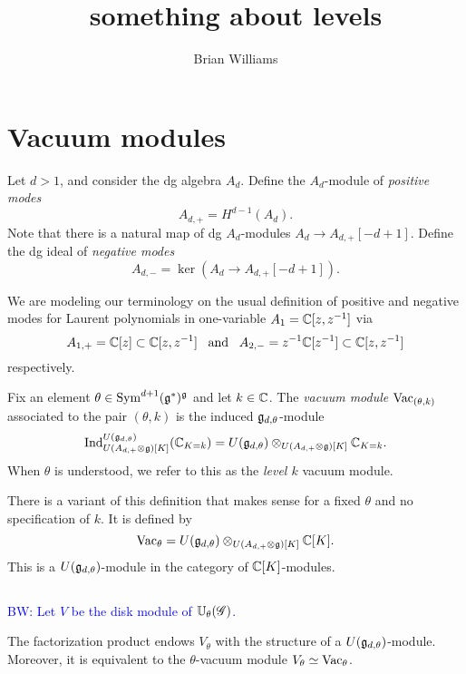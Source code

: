 \documentclass[11pt]{amsart}
\title{something about levels}
\author{Brian Williams}
\def\brian{\textcolor{blue}{BW: }\textcolor{blue}}
\newcommand{\changelocaltocdepth}[1]{%
  \addtocontents{toc}{\protect\setcounter{tocdepth}{#1}}%
  \setcounter{tocdepth}{#1}%
}
\begin{document}
\maketitle

%
%
%
%
%
%

\section{Vacuum modules}

\begin{dfn}
Let $d > 1$, and consider the dg algebra $A_d$. 
Define the $A_d$-module of {\em positive modes}
\[
A_{d,+} = H^{d-1}(A_d) .
\] 
Note that there is a natural map of dg $A_d$-modules $A_{d} \to A_{d,+}[-d+1]$. 
Define the dg ideal of {\em negative modes}
\[
A_{d,-} = \ker\left(A_d \to A_{d,+}[-d+1]\right) .
\]
\end{dfn}

\begin{rmk} 
We are modeling our terminology on the usual definition of positive and negative modes for Laurent polynomials in one-variable $A_1 = \mathbb C[z,z^{-1}]$ via
\[
A_{1,+} = \mathbb C[z] \subset \mathbb C[z,z^{-1}]  \;\;\; {\rm and} \;\;\;  A_{2,-} = z^{-1} \mathbb C[z^{-1}] \subset \mathbb C[z,z^{-1}]
\]
respectively. 
\end{rmk}

\def\Vac{{\rm Vac}}

\begin{dfn}
Fix an element $\theta \in {\rm Sym}^{d+1}(\mathfrak g^*)^\mathfrak g$ and let $k \in \mathbb C$.
The {\em vacuum module} $\Vac_{(\theta,k)}$ associated to the pair $(\theta, k)$ is the induced $\mathfrak g_{d, \theta}$-module
\[
{\rm Ind}_{U(A_{d,+} \otimes \mathfrak g)[K]}^{U(\mathfrak g_{d, \theta})} (\mathbb C_{K=k}) = U(\mathfrak g_{d,\theta}) \otimes_{U(A_{d,+} \otimes \mathfrak g)[K]} \mathbb C_{K=k} .
\] 
When $\theta$ is understood, we refer to this as the {\em level $k$} vacuum module. 
\end{dfn}

There is a variant of this definition that makes sense for a fixed $\theta$ and no specification of $k$. 
It is defined by
\[
{\rm Vac}_\theta = U(\mathfrak g_{d,\theta}) \otimes_{U(A_{d,+} \otimes \mathfrak g)[K]} \mathbb C[K] .
\]
This is a $U(\mathfrak g_{d,\theta})$-module in the category of $\mathbb C[K]$-modules. 
\subsection{}
\brian{Let $V$ be the disk module of $\mathbb U_\theta(\mathscr G)$.}

\begin{prop}
The factorization product endows $V_\theta$ with the structure of a $U(\mathfrak g_{d,\theta})$-module.
Moreover, it is equivalent to the $\theta$-vacuum module $V_\theta \simeq {\rm Vac}_{\theta}$. 
\end{prop}

\changelocaltocdepth{-10}

%  

\end{document}
